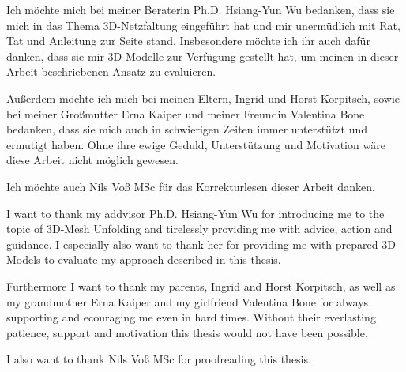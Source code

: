 \documentclass[draft,final]{vutinfth} %
\begin{document}
\frontmatter %

\addstatementpage

\begin{danksagung*}
Ich möchte mich bei meiner Beraterin Ph.D. Hsiang-Yun Wu bedanken, dass sie mich in das Thema 3D-Netzfaltung eingeführt hat und mir unermüdlich mit Rat, Tat und Anleitung zur Seite stand. Insbesondere möchte ich ihr auch dafür danken, dass sie mir 3D-Modelle zur Verfügung gestellt hat, um meinen in dieser Arbeit beschriebenen Ansatz zu evaluieren. 

Außerdem möchte ich mich bei meinen Eltern, Ingrid und Horst Korpitsch, sowie bei meiner Großmutter Erna Kaiper und meiner Freundin Valentina Bone bedanken, dass sie mich auch in schwierigen Zeiten immer unterstützt und ermutigt haben. Ohne ihre ewige Geduld, Unterstützung und Motivation wäre diese Arbeit nicht möglich gewesen.

Ich möchte auch Nils Voß MSc für das Korrekturlesen dieser Arbeit danken.
\end{danksagung*}

\begin{acknowledgements*}
I want to thank my addvisor Ph.D. Hsiang-Yun Wu for introducing me to the topic of 3D-Mesh Unfolding and tirelessly providing me with advice, action and guidance. I especially also want to thank her for providing me with prepared 3D-Models to evaluate my approach described in this thesis. 

Furthermore I want to thank my parents, Ingrid and Horst Korpitsch, as well as my grandmother Erna Kaiper and my girlfriend Valentina Bone for always supporting and ecouraging me even in hard times. Without their everlasting patience, support and motivation this thesis would not have been possible.

I also want to thank Nils Voß MSc for proofreading this thesis.
\end{acknowledgements*}
\end{document}
